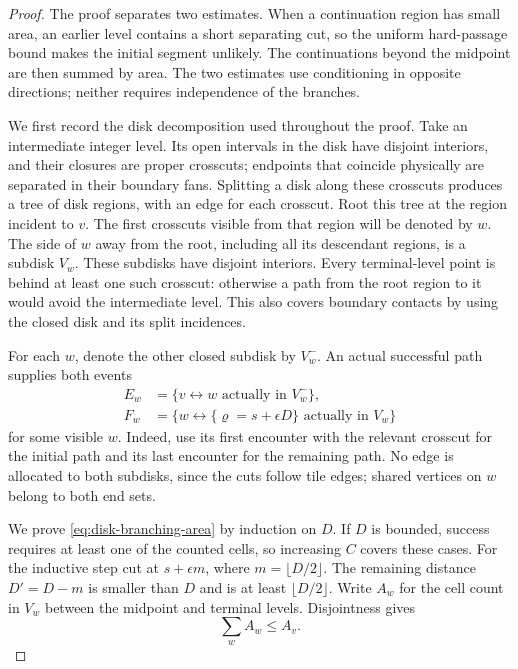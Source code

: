 \begin{proof}
The proof separates two estimates. When a continuation region has
small area, an earlier level contains a short separating cut, so the
uniform hard-passage bound makes the initial segment unlikely. The
continuations beyond the midpoint are then summed by area. The two
estimates use conditioning in opposite directions; neither requires
independence of the branches.

We first record the disk decomposition used throughout the proof.
Take an intermediate integer level.  Its open intervals in the disk
have disjoint interiors, and their closures are proper crosscuts;
endpoints that coincide physically are separated in their boundary
fans.  Splitting a disk along these crosscuts produces a tree of disk
regions, with an edge for each crosscut.  Root this tree at the region
incident to $v$.  The first crosscuts visible from that region will be
denoted by $w$.  The side of $w$ away from the root, including all its
descendant regions, is a subdisk $V_w$.  These subdisks have disjoint
interiors.  Every terminal-level point is behind at least one such
crosscut: otherwise a path from the root region to it would avoid the
intermediate level.  This also covers boundary contacts by using the
closed disk and its split incidences.

For each $w$, denote the other closed subdisk by $V_w^-$.  An actual
successful path supplies both events
\[
 \begin{aligned}
 E_w&=\{v\longleftrightarrow w\text{ actually in }V_w^-\},\\
 F_w&=\{w\longleftrightarrow\{\varrho=s+\epsilon D\}
                     \text{ actually in }V_w\}
 \end{aligned}
\]
for some visible $w$.  Indeed, use its first encounter with the relevant
crosscut for the initial path and its last encounter for the remaining
path.  No edge is allocated to both subdisks, since the cuts follow tile
edges; shared vertices on $w$ belong to both end sets.

We prove \eqref{eq:disk-branching-area} by induction on $D$.  If $D$ is
bounded, success requires at least one of the counted cells, so increasing
$C$ covers these cases.  For the inductive step cut at
$s+\epsilon m$, where $m=\lfloor D/2\rfloor$.  The remaining distance
$D'=D-m$ is smaller than $D$ and is at least $\lfloor D/2\rfloor$.
Write $A_w$ for the cell count in $V_w$ between the midpoint and terminal
levels.  Disjointness gives
\begin{equation}\label{eq:disk-branching-area-sum}
 \sum_w A_w\le A_v.
\end{equation}


\end{proof}
